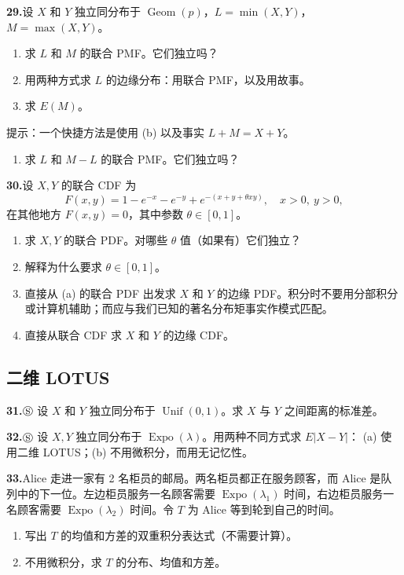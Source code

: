 \documentclass[UTF8, 12pt, fontset=fandol, oneside]{ctexart}
\begin{document}
\noindent\textbf{29.}\quad 设 $X$ 和 $Y$ 独立同分布于 $\operatorname{Geom}(p)$，$L=\min(X,Y)$，$M=\max(X,Y)$。
\begin{enumerate}
  \item[(a)] 求 $L$ 和 $M$ 的联合 PMF。它们独立吗？
  \item[(b)] 用两种方式求 $L$ 的边缘分布：用联合 PMF，以及用故事。
  \item[(c)] 求 $E(M)$。
\end{enumerate}
提示：一个快捷方法是使用 (b) 以及事实 $L+M=X+Y$。
\begin{enumerate}
  \item[(d)] 求 $L$ 和 $M-L$ 的联合 PMF。它们独立吗？
\end{enumerate}

\noindent\textbf{30.}\quad 设 $X,Y$ 的联合 CDF 为
\[
  F(x,y)=1-e^{-x}-e^{-y}+e^{-(x+y+\theta xy)},\quad x>0,\ y>0,
\]
在其他地方 $F(x,y)=0$，其中参数 $\theta\in[0,1]$。
\begin{enumerate}
  \item[(a)] 求 $X,Y$ 的联合 PDF。对哪些 $\theta$ 值（如果有）它们独立？
  \item[(b)] 解释为什么要求 $\theta\in[0,1]$。
  \item[(c)] 直接从 (a) 的联合 PDF 出发求 $X$ 和 $Y$ 的边缘 PDF。积分时不要用分部积分或计算机辅助；而应与我们已知的著名分布矩事实作模式匹配。
  \item[(d)] 直接从联合 CDF 求 $X$ 和 $Y$ 的边缘 CDF。
\end{enumerate}

\subsection*{二维 LOTUS}

\noindent\textbf{31.}\quad $\circledS$ 设 $X$ 和 $Y$ 独立同分布于 $\operatorname{Unif}(0,1)$。求 $X$ 与 $Y$ 之间距离的标准差。

\noindent\textbf{32.}\quad $\circledS$ 设 $X,Y$ 独立同分布于 $\operatorname{Expo}(\lambda)$。用两种不同方式求 $E|X-Y|$： (a) 使用二维 LOTUS；(b) 不用微积分，而用无记忆性。

\noindent\textbf{33.}\quad Alice 走进一家有 2 名柜员的邮局。两名柜员都正在服务顾客，而 Alice 是队列中的下一位。左边柜员服务一名顾客需要 $\operatorname{Expo}(\lambda_1)$ 时间，右边柜员服务一名顾客需要 $\operatorname{Expo}(\lambda_2)$ 时间。令 $T$ 为 Alice 等到轮到自己的时间。
\begin{enumerate}
  \item[(a)] 写出 $T$ 的均值和方差的双重积分表达式（不需要计算）。
  \item[(b)] 不用微积分，求 $T$ 的分布、均值和方差。
\end{enumerate}
\end{document}
